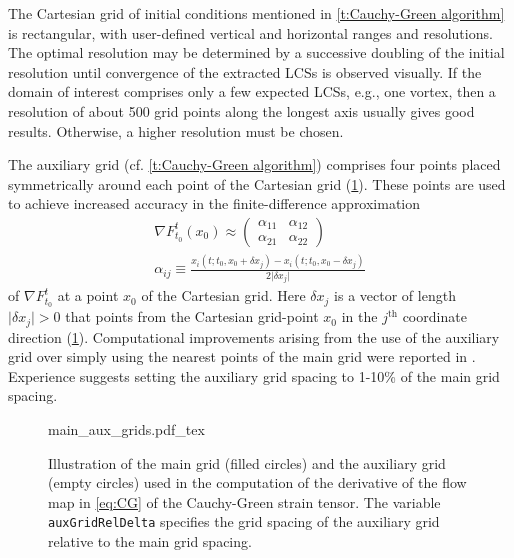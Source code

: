 \documentclass{article}
\begin{document}
The Cartesian grid of initial conditions mentioned in \cref{t:Cauchy-Green algorithm} is rectangular, with user-defined vertical and horizontal ranges and resolutions. The optimal resolution may be determined by a successive doubling of the initial resolution until convergence of the extracted LCSs is observed visually. If the domain of interest comprises only a few expected LCSs, e.g., one vortex, then a resolution of about 500 grid points along the longest axis usually gives good results. Otherwise, a higher resolution must be chosen.

The auxiliary grid (cf. \cref{t:Cauchy-Green algorithm}) comprises four points placed symmetrically around each point of the Cartesian grid (\cref{f:main and auxiliary grids}). These points are used to achieve increased accuracy in the finite-difference approximation
\begin{gather*}
\nabla F_{t_0}^t(x_0) \approx
\left(\begin{array}{cc}
\alpha_{11} & \alpha_{12}
\\
\alpha_{21} & \alpha_{22}
\end{array}\right)
\\
\alpha_{ij} \equiv \frac{x_i(t;t_0,x_0+\delta x_j) - x_i(t;t_0,x_0-\delta x_j)}{2\vert\delta x_j\vert}
\end{gather*}
of $\nabla F_{t_0}^t$ at a point $x_0$ of the Cartesian grid. Here $\delta x_j$ is a vector of length $\vert\delta x_j\vert > 0$ that points from the Cartesian grid-point $x_0$ in the $j^\text{th}$ coordinate direction (\cref{f:main and auxiliary grids}). Computational improvements arising from the use of the auxiliary grid over simply using the nearest points of the main grid were reported in \textcite{farazmand12:_comput_lagran}. Experience suggests setting the auxiliary grid spacing to 1-10\% of the main grid spacing.

\begin{figure}
\begin{center}
\def\svgwidth{.75\textwidth}
{main_aux_grids.pdf_tex}
\end{center}
\caption{Illustration of the main grid (filled circles) and the auxiliary grid (empty circles) used in the computation of the derivative of the flow map in \cref{eq:CG} of the Cauchy-Green strain tensor. The variable \lstinline!auxGridRelDelta! specifies the grid spacing of the auxiliary grid relative to the main grid spacing.}
\label{f:main and auxiliary grids}
\end{figure}
\end{document}
